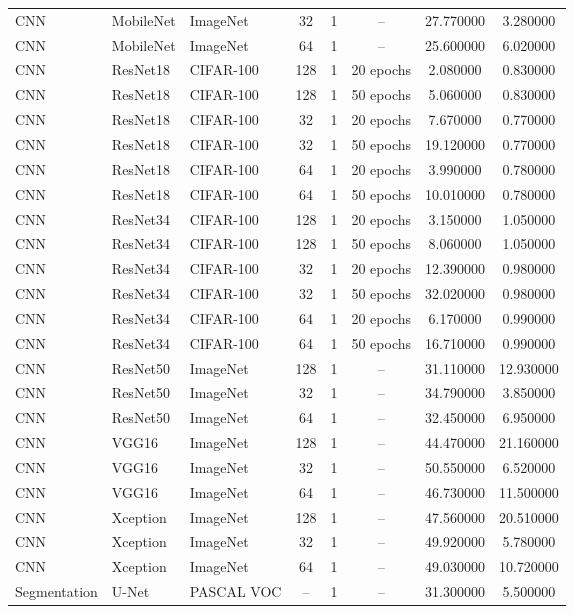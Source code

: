 \begin{table}
\begin{tabular}{lllccccc}
CNN & MobileNet & ImageNet & 32 & 1 & -- & 27.770000 & 3.280000 \\
CNN & MobileNet & ImageNet & 64 & 1 & -- & 25.600000 & 6.020000 \\
CNN & ResNet18 & CIFAR-100 & 128 & 1 & 20 epochs & 2.080000 & 0.830000 \\
CNN & ResNet18 & CIFAR-100 & 128 & 1 & 50 epochs & 5.060000 & 0.830000 \\
CNN & ResNet18 & CIFAR-100 & 32 & 1 & 20 epochs & 7.670000 & 0.770000 \\
CNN & ResNet18 & CIFAR-100 & 32 & 1 & 50 epochs & 19.120000 & 0.770000 \\
CNN & ResNet18 & CIFAR-100 & 64 & 1 & 20 epochs & 3.990000 & 0.780000 \\
CNN & ResNet18 & CIFAR-100 & 64 & 1 & 50 epochs & 10.010000 & 0.780000 \\
CNN & ResNet34 & CIFAR-100 & 128 & 1 & 20 epochs & 3.150000 & 1.050000 \\
CNN & ResNet34 & CIFAR-100 & 128 & 1 & 50 epochs & 8.060000 & 1.050000 \\
CNN & ResNet34 & CIFAR-100 & 32 & 1 & 20 epochs & 12.390000 & 0.980000 \\
CNN & ResNet34 & CIFAR-100 & 32 & 1 & 50 epochs & 32.020000 & 0.980000 \\
CNN & ResNet34 & CIFAR-100 & 64 & 1 & 20 epochs & 6.170000 & 0.990000 \\
CNN & ResNet34 & CIFAR-100 & 64 & 1 & 50 epochs & 16.710000 & 0.990000 \\
CNN & ResNet50 & ImageNet & 128 & 1 & -- & 31.110000 & 12.930000 \\
CNN & ResNet50 & ImageNet & 32 & 1 & -- & 34.790000 & 3.850000 \\
CNN & ResNet50 & ImageNet & 64 & 1 & -- & 32.450000 & 6.950000 \\
CNN & VGG16 & ImageNet & 128 & 1 & -- & 44.470000 & 21.160000 \\
CNN & VGG16 & ImageNet & 32 & 1 & -- & 50.550000 & 6.520000 \\
CNN & VGG16 & ImageNet & 64 & 1 & -- & 46.730000 & 11.500000 \\
CNN & Xception & ImageNet & 128 & 1 & -- & 47.560000 & 20.510000 \\
CNN & Xception & ImageNet & 32 & 1 & -- & 49.920000 & 5.780000 \\
CNN & Xception & ImageNet & 64 & 1 & -- & 49.030000 & 10.720000 \\
Segmentation & U-Net & PASCAL VOC & -- & 1 & -- & 31.300000 & 5.500000 \\

\end{tabular}
\end{table}

